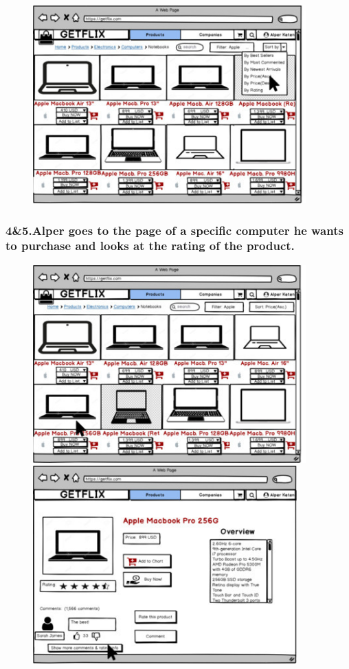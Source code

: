 \documentclass[]{article}
\begin{document}
\begin{figure}[H]
    \centering
    \includegraphics[height=3in]{./images/28.jpg}
\end{figure}

\hypertarget{alper-goes-to-the-page-of-a-specific-computer-he-wants-to-purchase-and-looks-at-the-rating-of-the-product.}{%
    \subsubsection{4\&5.Alper goes to the page of a specific computer he
        wants to purchase and looks at the rating of the
        product.}\label{alper-goes-to-the-page-of-a-specific-computer-he-wants-to-purchase-and-looks-at-the-rating-of-the-product.}}

\begin{figure}[H]
    \centering
    \includegraphics[height=3in]{./images/29.jpg} \includegraphics[height=3in]{./images/30.jpg}
\end{figure}
\end{document}
